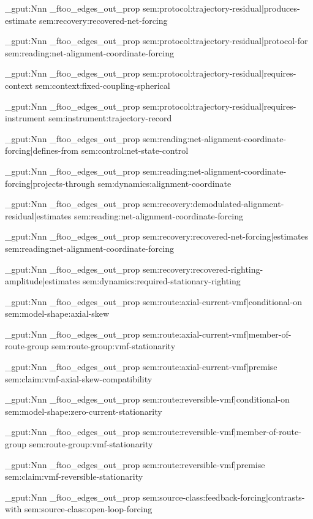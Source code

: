 \prop_gput:Nnn \g_ftoo_edges_out_prop { sem:protocol:trajectory-residual|produces-estimate } { sem:recovery:recovered-net-forcing }

\prop_gput:Nnn \g_ftoo_edges_out_prop { sem:protocol:trajectory-residual|protocol-for } { sem:reading:net-alignment-coordinate-forcing }

\prop_gput:Nnn \g_ftoo_edges_out_prop { sem:protocol:trajectory-residual|requires-context } { sem:context:fixed-coupling-spherical }

\prop_gput:Nnn \g_ftoo_edges_out_prop { sem:protocol:trajectory-residual|requires-instrument } { sem:instrument:trajectory-record }

\prop_gput:Nnn \g_ftoo_edges_out_prop { sem:reading:net-alignment-coordinate-forcing|defines-from } { sem:control:net-state-control }

\prop_gput:Nnn \g_ftoo_edges_out_prop { sem:reading:net-alignment-coordinate-forcing|projects-through } { sem:dynamics:alignment-coordinate }

\prop_gput:Nnn \g_ftoo_edges_out_prop { sem:recovery:demodulated-alignment-residual|estimates } { sem:reading:net-alignment-coordinate-forcing }

\prop_gput:Nnn \g_ftoo_edges_out_prop { sem:recovery:recovered-net-forcing|estimates } { sem:reading:net-alignment-coordinate-forcing }

\prop_gput:Nnn \g_ftoo_edges_out_prop { sem:recovery:recovered-righting-amplitude|estimates } { sem:dynamics:required-stationary-righting }

\prop_gput:Nnn \g_ftoo_edges_out_prop { sem:route:axial-current-vmf|conditional-on } { sem:model-shape:axial-skew }

\prop_gput:Nnn \g_ftoo_edges_out_prop { sem:route:axial-current-vmf|member-of-route-group } { sem:route-group:vmf-stationarity }

\prop_gput:Nnn \g_ftoo_edges_out_prop { sem:route:axial-current-vmf|premise } { sem:claim:vmf-axial-skew-compatibility }

\prop_gput:Nnn \g_ftoo_edges_out_prop { sem:route:reversible-vmf|conditional-on } { sem:model-shape:zero-current-stationarity }

\prop_gput:Nnn \g_ftoo_edges_out_prop { sem:route:reversible-vmf|member-of-route-group } { sem:route-group:vmf-stationarity }

\prop_gput:Nnn \g_ftoo_edges_out_prop { sem:route:reversible-vmf|premise } { sem:claim:vmf-reversible-stationarity }

\prop_gput:Nnn \g_ftoo_edges_out_prop { sem:source-class:feedback-forcing|contrasts-with } { sem:source-class:open-loop-forcing }

